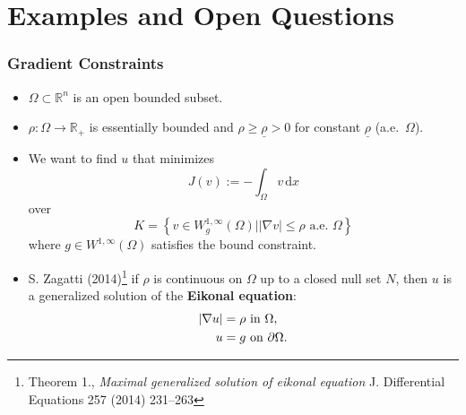 \documentclass[aspectratio=169,xcolor=dvipsnames,11pt]{beamer}
\begin{document}
\section{Examples and Open Questions}
\begin{frame}\frametitle{Gradient Constraints}
\begin{itemize}
\item  $\Omega \subset \mathbb R^n$ is an open bounded subset.
\item  $\rho : \Omega \to \mathbb R_+$ is essentially bounded and $\rho \ge \underline{\rho} > 0$ for constant $\underline{\rho}$ (a.e.\ $\Omega$).
\item We want to find $u$  that  minimizes 
\[
J(v) := -\int_{\Omega} v \, \mathrm{d} x 
\] 
over
\[
K = \left\{
v \in W^{1,\infty}_g(\Omega) \left| | \nabla v | \le \rho \text{ a.e. } \Omega \right.
\right\}
\] 
where $g \in W^{1,\infty}(\Omega)$ satisfies the bound constraint. \pause
\item S. Zagatti (2014)\footnote{\tiny Theorem 1., \textit{Maximal generalized solution of eikonal equation}  J. Differential Equations 257 (2014) 231–263 } if $\rho$ is continuous on $\Omega$ up to a closed null set $N$, then $u$ is a generalized solution of the \textbf{Eikonal equation}:
\begin{equation}\label{eq:eik}
\aligned
|\nabla u| &= \rho \text{ in } \Omega,\\
u &= g \text{ on } \partial \Omega.
\endaligned
\end{equation}
\end{itemize}
\end{frame}
\end{document}
